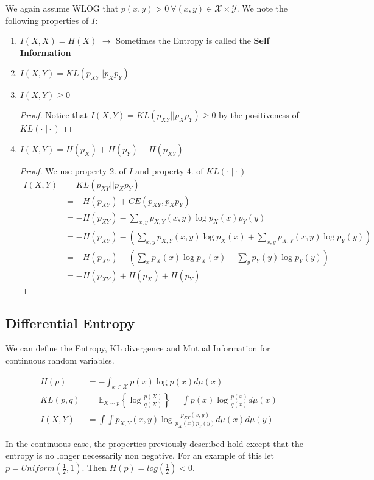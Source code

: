 \documentclass[]{article}
\theoremstyle{mattstyle}
\theoremstyle{definition}
\begin{document}
We again assume WLOG that \(p(x,y)>0 \ \forall (x,y)\in\mathcal{X}\times\mathcal{Y}\). We note the following properties of $I$:

\begin{enumerate}
	\item \(I(X,X) = H(X)\) \(\rightarrow\) Sometimes the Entropy is called the \textbf{Self Information}
	\item $I(X,Y) = KL(p_{XY}||p_Xp_Y)$
	\item \(I(X,Y)\ge 0\)
	\begin{proof}
		Notice that \(I(X,Y) = KL(p_{XY}||p_Xp_Y) \ge 0\) by the positiveness of \(KL(\cdot||\cdot)\)
	\end{proof}
	\item $I(X,Y) = H(p_X) + H(p_Y) -H(p_{XY})$
	\begin{proof} We use property 2. of $I$ and property 4. of \(KL(\cdot||\cdot)\)
		\begin{align*}
		I(X,Y) &= KL(p_{XY}||p_Xp_Y) \\
		&= -H(p_{XY}) + CE(p_{XY},p_Xp_Y) \\
		&= -H(p_{XY}) - \sum_{x,y}p_{X,Y}(x,y)\log p_X(x)p_Y(y)\\
		&= -H(p_{XY}) - \left(\sum_{x,y}p_{X,Y}(x,y)\log p_X(x) + \sum_{x,y}p_{X,Y}(x,y)\log p_Y(y)\right)\\
		&=-H(p_{XY}) - \left(\sum_{x}p_{X}(x)\log p_X(x) + \sum_{y}p_{Y}(y)\log p_Y(y)\right)\\
		&= -H(p_{XY}) + H(p_X) + H(p_Y)
		\end{align*}
	\end{proof}
	
\end{enumerate}

\subsection{Differential Entropy}
We can define the Entropy, KL divergence and Mutual Information for continuous random variables.

\begin{align}
H(p) &= -\int_{x\in\mathcal{X}}p(x)\log p(x)d\mu(x) \\
KL(p,q) &= \mathbb{E}_{X\sim p}\left\{\log \frac{p(X)}{q(X)}\right\} = \int p(x)\log\frac{p(x)}{q(x)}d\mu(x)\\
I(X,Y) &=\int\int p_{X,Y}(x,y)\log\frac{p_{XY}(x,y)}{p_X(x)p_Y(y)}d\mu(x)d\mu(y)
\end{align}

In the continuous case, the properties previously described hold except that the entropy is no longer necessarily non negative. For an example of this let $p = Uniform\left(\frac{1}{2},1\right)$. Then $H(p) = log(\frac{1}{2}) < 0$.
\end{document}
